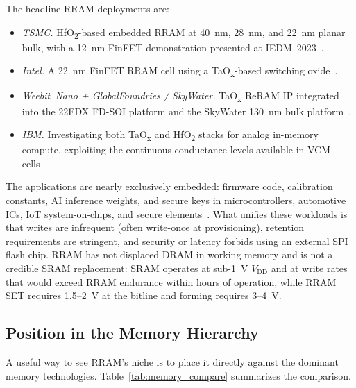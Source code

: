 \documentclass[lettersize,journal]{IEEEtran}
\begin{document}
The headline RRAM deployments are:
\begin{itemize}
\item \textit{TSMC.} HfO\textsubscript{2}-based embedded RRAM at 40~nm, 28~nm, and 22~nm planar bulk, with a 12~nm FinFET demonstration presented at IEDM~2023~\cite{ref_hellenbrand2024}.
\item \textit{Intel.} A 22~nm FinFET RRAM cell using a TaO\textsubscript{x}-based switching oxide~\cite{ref_hellenbrand2024}.
\item \textit{Weebit~Nano + GlobalFoundries / SkyWater.} TaO\textsubscript{x} ReRAM IP integrated into the 22FDX FD-SOI platform and the SkyWater 130~nm bulk platform~\cite{ref_hellenbrand2024}.
\item \textit{IBM.} Investigating both TaO\textsubscript{x} and HfO\textsubscript{2} stacks for analog in-memory compute, exploiting the continuous conductance levels available in VCM cells~\cite{ref_hellenbrand2024,ref_ielmini_wong2018}.
\end{itemize}

The applications are nearly exclusively embedded: firmware code, calibration constants, AI inference weights, and secure keys in microcontrollers, automotive ICs, IoT system-on-chips, and secure elements~\cite{ref_hellenbrand2024}. What unifies these workloads is that writes are infrequent (often write-once at provisioning), retention requirements are stringent, and security or latency forbids using an external SPI flash chip. RRAM has not displaced DRAM in working memory and is not a credible SRAM replacement: SRAM operates at sub-1~V $V_\mathrm{DD}$ and at write rates that would exceed RRAM endurance within hours of operation, while RRAM SET requires 1.5--2~V at the bitline and forming requires 3--4~V.

\subsection{Position in the Memory Hierarchy}
A useful way to see RRAM's niche is to place it directly against the dominant memory technologies. Table~\ref{tab:memory_compare} summarizes the comparison.
\end{document}
